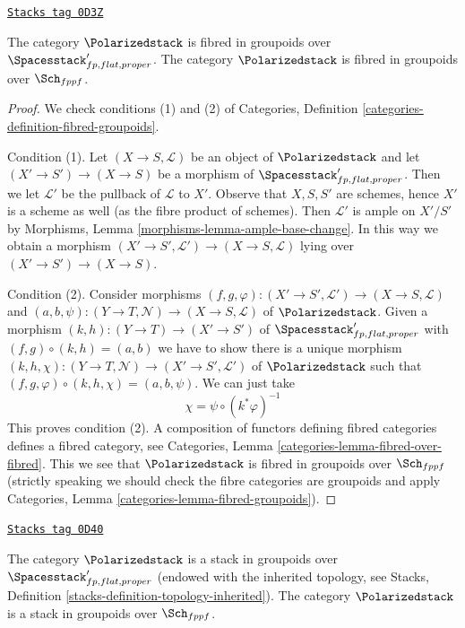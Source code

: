 \begin{lemma}
\label{quot-lemma-polarized-fibred-in-groupoids}
\href{https://stacks.math.columbia.edu/tag/0D3Z}{\texttt{Stacks tag 0D3Z}}

The category $\Polarizedstack$ is fibred in groupoids over
$\Spacesstack'_{fp, flat, proper}$.
The category $\Polarizedstack$ is fibred in groupoids over $\Sch_{fppf}$.
\end{lemma}

\begin{proof}
We check conditions (1) and (2) of
Categories, Definition \ref{categories-definition-fibred-groupoids}.

\medskip\noindent
Condition (1). Let $(X \to S, \mathcal{L})$ be an object of
$\Polarizedstack$ and let $(X' \to S') \to (X \to S)$
be a morphism of $\Spacesstack'_{fp, flat, proper}$. Then we
let $\mathcal{L}'$ be the pullback of $\mathcal{L}$ to $X'$.
Observe that $X, S, S'$ are schemes, hence $X'$ is a scheme
as well (as the fibre product of schemes). Then
$\mathcal{L}'$ is ample on $X'/S'$ by
Morphisms, Lemma \ref{morphisms-lemma-ample-base-change}.
In this way we obtain a morphism
$(X' \to S', \mathcal{L}') \to (X \to S, \mathcal{L})$
lying over $(X' \to S') \to (X \to S)$.

\medskip\noindent
Condition (2). Consider morphisms
$(f, g, \varphi) : (X' \to S', \mathcal{L}') \to (X \to S, \mathcal{L})$ and
$(a, b, \psi) : (Y \to T, \mathcal{N}) \to (X \to S, \mathcal{L})$
of $\Polarizedstack$. Given a morphism $(k, h) : (Y \to T) \to (X' \to S')$
of $\Spacesstack'_{fp, flat, proper}$
with $(f, g) \circ (k, h) = (a, b)$ we have to show
there is a unique morphism
$(k, h, \chi) : (Y \to T, \mathcal{N}) \to (X' \to S', \mathcal{L}')$
of $\Polarizedstack$ such that
$(f, g, \varphi) \circ (k, h, \chi) = (a, b, \psi)$.
We can just take
$$
\chi = \psi \circ (k^*\varphi)^{-1}
$$
This proves condition (2). A composition of functors defining
fibred categories defines a fibred category, see
Categories, Lemma \ref{categories-lemma-fibred-over-fibred}.
This we see that $\Polarizedstack$ is fibred in groupoids over
$\Sch_{fppf}$ (strictly speaking we should check the fibre
categories are groupoids and apply
Categories, Lemma \ref{categories-lemma-fibred-groupoids}).
\end{proof}

\begin{lemma}
\label{quot-lemma-polarized-stack}
\href{https://stacks.math.columbia.edu/tag/0D40}{\texttt{Stacks tag 0D40}}

The category $\Polarizedstack$ is a stack in groupoids over
$\Spacesstack'_{fp, flat, proper}$ (endowed with the inherited topology,
see Stacks, Definition \ref{stacks-definition-topology-inherited}).
The category $\Polarizedstack$ is a stack in groupoids over $\Sch_{fppf}$.
\end{lemma}

